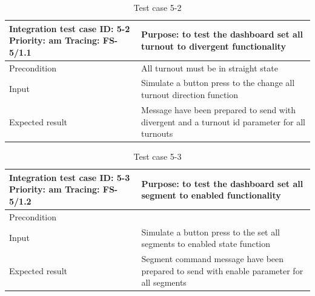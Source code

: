 \begin{table}[H]
	\caption{Test case 5-2}
	\label{table:TCase-FS5-2}
	\begin{center}
		\renewcommand{\arraystretch}{1.8}
		\begin{tabu} 
			to 0.9 \textwidth
			{  X[0.4, c] X[c] }
			\toprule
			Integration test case ID: 5-2 \newline Priority: am \newline Tracing: FS-5/1.1 & Purpose: to test the dashboard set all turnout to divergent functionality                     \\ \midrule
			Precondition                                                                   & All turnout must be in straight state                                                         \\
			Input                                                                          & Simulate a button press to the change all turnout direction function                          \\
			Expected result                                                                & Message have been prepared to send with divergent and a turnout id parameter for all turnouts \\ \bottomrule
		\end{tabu}
	\end{center}
\end{table}

\begin{table}[H]
	\caption{Test case 5-3}
	\label{table:TCase-FS5-3}
	\begin{center}
		\renewcommand{\arraystretch}{1.8}
		\begin{tabu} 
			to 0.9 \textwidth
			{  X[0.4, c] X[c] }
			\toprule
			Integration test case ID: 5-3 \newline Priority: am \newline Tracing: FS-5/1.2 & Purpose: to test the dashboard set all segment to enabled functionality                      \\ \midrule
			Precondition                                                                   &                                                                                              \\
			Input                                                                          & Simulate a button press to the set all segments to enabled state function                         \\
			Expected result                                                                & Segment command message have been prepared to send with enable parameter for all segments \\ \bottomrule
		\end{tabu}
	\end{center}
\end{table}

